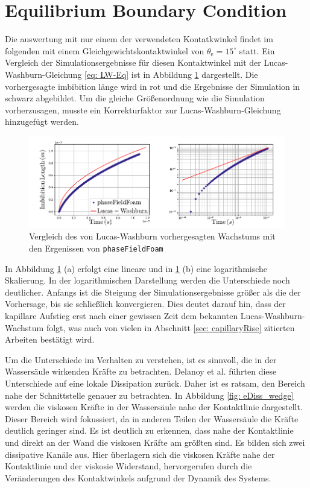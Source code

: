 \section{Equilibrium Boundary Condition} 
\label{sec: EquilibriumBoundaryCondition}
Die auswertung mit nur einem der verwendeten Kontatkwinkel findet im folgenden mit einem Gleichgewichtskontaktwinkel von $\theta_{\mathrm{e}}=15^{\circ}$ statt. Ein Vergleich der Simulationsergebnisse für diesen Kontaktwinkel mit der Lucas-Washburn-Gleichung \ref{eq: LW-Eq} ist in Abbildung \ref{fig: LW-PFF_comp} dargestellt. Die vorhergesagte imbibition länge wird in rot und die Ergebnisse der Simulation in schwarz abgebildet. Um die gleiche Größenordnung wie die Simulation vorherzusagen, musste ein Korrekturfaktor zur Lucas-Washburn-Gleichung hinzugefügt werden.
\begin{figure}[h]
    \centering
    \includegraphics[width=.95\textwidth]{Pictures/LW-lin_loglog.pdf}
    \caption{Vergleich des von Lucas-Washburn vorhergesagten Wachstums mit den Ergenissen von \texttt{phaseFieldFoam}}
    \label{fig: LW-PFF_comp}
\end{figure}
In Abbildung \ref{fig: LW-PFF_comp} (a) erfolgt eine lineare und in \ref{fig: LW-PFF_comp} (b) eine logarithmische Skalierung. In der logarithmischen Darstellung werden die Unterschiede noch deutlicher. Anfangs ist die Steigung der Simulationsergebnisse größer als die der Vorhersage, bis sie schließlich konvergieren. Dies deutet darauf hin, dass der kapillare Aufstieg erst nach einer gewissen Zeit dem bekannten Lucas-Washburn-Wachstum folgt, was auch von vielen in Abschnitt \ref{sec: capillaryRise} zitierten Arbeiten bestätigt wird. 

Um die Unterschiede im Verhalten zu verstehen, ist es sinnvoll, die in der Wassersäule wirkenden Kräfte zu betrachten. Delanoy et al. \cite{delannoy2019DualRoleViscosity} führten diese Unterschiede auf eine lokale Dissipation zurück. Daher ist es ratsam, den Bereich nahe der Schnittstelle genauer zu betrachten. In Abbildung \ref{fig: eDiss_wedge} werden die viskosen Kräfte in der Wassersäule nahe der Kontaktlinie dargestellt. Dieser Bereich wird fokussiert, da in anderen Teilen der Wassersäule die Kräfte deutlich geringer sind. Es ist deutlich zu erkennen, dass nahe der Kontaktlinie und direkt an der Wand die viskosen Kräfte am größten sind. Es bilden sich zwei dissipative Kanäle aus. Hier überlagern sich die viskosen Kräfte nahe der Kontaktlinie und der viskosie Widerstand, hervorgerufen durch die Veränderungen des Kontaktwinkels aufgrund der Dynamik des Systems. 


